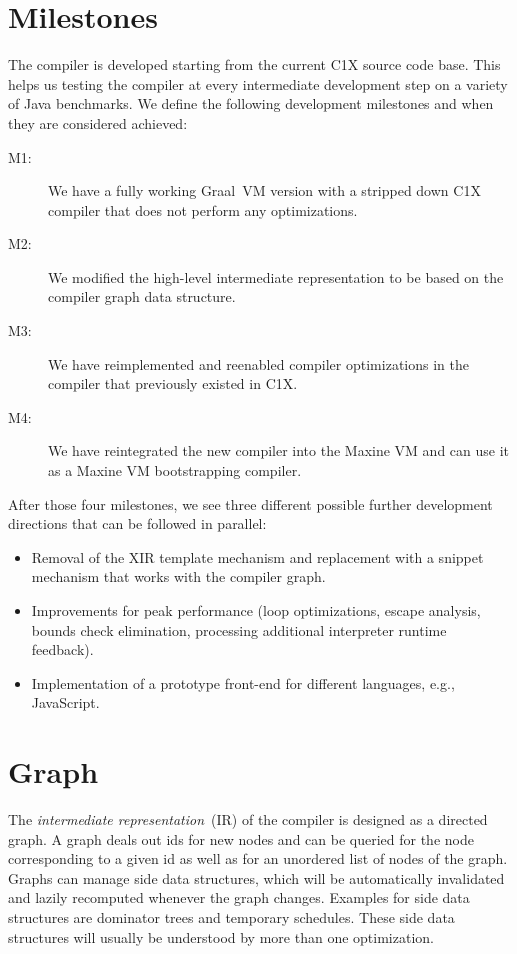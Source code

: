 \documentclass[twocolumn]{svjour3}
\begin{document}
\section{Milestones}
\label{sec:mile}
The compiler is developed starting from the current C1X source code base.
This helps us testing the compiler at every intermediate development step on a variety of Java benchmarks.
We define the following development milestones and when they are considered achieved:
\begin{description}
\item[M1:] We have a fully working Graal~VM version with a stripped down C1X compiler that does not perform any optimizations.
\item[M2:] We modified the high-level intermediate representation to be based on the compiler graph data structure.
\item[M3:] We have reimplemented and reenabled compiler optimizations in the compiler that previously existed in C1X.
\item[M4:] We have reintegrated the new compiler into the Maxine VM and can use it as a Maxine VM bootstrapping compiler.
\end{description}

After those four milestones, we see three different possible further development directions that can be followed in parallel:
\begin{itemize}
  \item Removal of the XIR template mechanism and replacement with a snippet mechanism that works with the compiler graph.
  \item Improvements for peak performance (loop optimizations, escape analysis, bounds check elimination, processing additional interpreter runtime feedback).
  \item Implementation of a prototype front-end for different languages, e.g., JavaScript.
\end{itemize}

\section{Graph}

The \emph{intermediate representation}~(IR) of the compiler is designed as a directed graph.
A graph deals out ids for new nodes and can be queried for the node corresponding to a given id as well as for an unordered list of nodes of the graph.
Graphs can manage side data structures, which will be automatically invalidated and lazily recomputed whenever the graph changes. Examples for side data structures are dominator trees and temporary schedules. These side data structures will usually be understood by more than one optimization.
\end{document}
